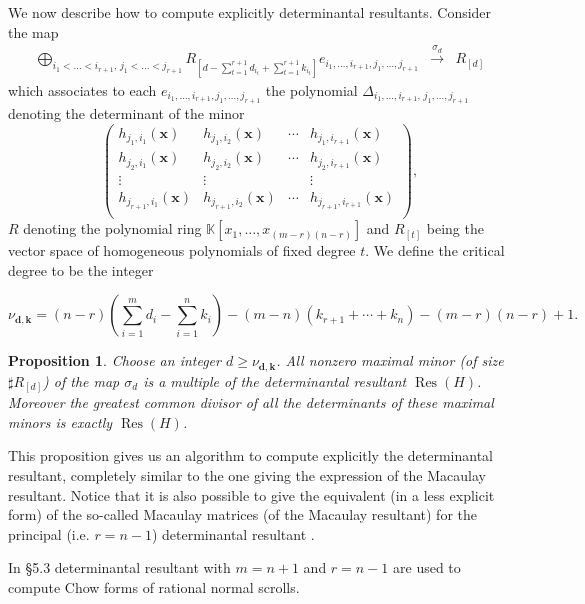 \documentclass[10pt]{amsart}
\theoremstyle{plain}
\newtheorem{prop}[thm]{Proposition}
\theoremstyle{definition}
\def\KK{{\mathbb{K}}}
\def\k{{\mathbf{k}}}
\def\x{\mathbf{x}}
\def\d{{\mathbf{d}}}
\DeclareMathOperator\Res{Res}
\begin{document}
We now describe how to compute explicitly determinantal resultants.  
Consider the map 
$$\begin{array}{ccl}
  \bigoplus_{i_1<\ldots < i_{r+1},\, j_1<\ldots <j_{r+1}}
  R_{[d-\sum_{t=1}^{r+1}d_{i_t}+\sum_{t=1}^{r+1}k_{i_t}]}e_{i_1,\ldots ,i_{r+1},j_1,\ldots ,j_{r+1}} &
  \xrightarrow{\sigma_{d}} & R_{[d]} 
\end{array}$$
which associates to each $e_{i_1,\ldots, i_{r+1},j_1,\ldots ,j_{r+1}}$
the polynomial $\Delta_{i_1,\ldots ,i_{r+1},\, j_1,\ldots ,j_{r+1}}$ 
 denoting the determinant of the minor 
$$\left( \begin{array}{cccc}
    h_{j_1,i_1}(\x) & h_{j_1,i_2}(\x) & \cdots & h_{j_1,i_{r+1}}(\x) \\
    h_{j_2,i_1}(\x) & h_{j_2,i_2}(\x) & \cdots & h_{j_2,i_{r+1}}(\x) \\
    \vdots & \vdots & & \vdots \\
    h_{j_{r+1},i_1}(\x) & h_{j_{r+1},i_2}(\x) & \cdots & h_{j_{r+1},i_{r+1}}(\x)\\
  \end{array} \right),$$
$R$ denoting the polynomial ring $\KK[x_1,\ldots,x_{(m-r)(n-r)}]$ and 
$R_{[t]}$ being the vector space of homogeneous polynomials of fixed
degree $t$. We define the critical degree to be the integer

$$\nu_{\d,\k}=(n-r)(\sum_{i=1}^m d_i - \sum_{i=1}^n k_i) -
 (m-n)(k_{r+1}+\cdots+k_n) - (m-r)(n-r)+1.$$

\begin{prop} Choose an integer $d\geq \nu_{\d,\k}$. All nonzero maximal
  minor (of size $\sharp R_{[d]}$) of the map $\sigma_{d}$ is a  
 multiple of the determinantal resultant $\Res(H)$. 
  Moreover the greatest common divisor of all the determinants of
  these maximal minors is exactly $\Res(H)$.
\end{prop}

This proposition gives us an algorithm to compute explicitly 
the determinantal resultant, completely similar  
to the one giving the expression of the Macaulay resultant. Notice
that it is also possible to give the equivalent (in a less 
explicit form) of the 
so-called Macaulay matrices (of the Macaulay resultant) for the
principal (i.e. $r=n-1$) determinantal resultant \cite{BusPhD,Bus04}. 

In \cite{Bus04} \S5.3 determinantal resultant with $m=n+1$ and $r=n-1$ are used to compute Chow forms of rational normal scrolls. 

\end{document}
